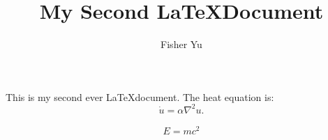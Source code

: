 \documentclass{article}
\title{My Second \LaTeX Document}  %
\author{Fisher Yu}
\begin{document}
\maketitle
This is my second  ever \LaTeX document. The heat equation is:
\begin{equation}
  \dot{u} = \alpha \nabla^2 u.
\end{equation}

\begin{align*}
E = mc^2
\end{align*}
\end{document}
